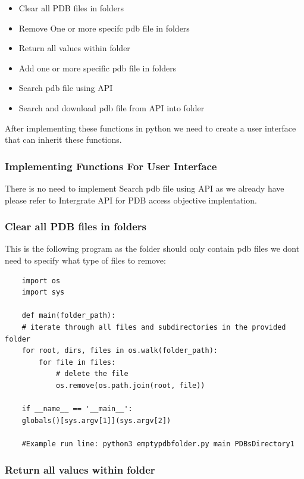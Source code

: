 \documentclass[]{final_report}
\begin{document}
\begin{itemize}
    \item Clear all PDB files in folders
    \item Remove One or more specifc pdb file in folders
    \item Return all values within folder
    \item Add one or more specific pdb file in folders
    \item Search pdb file using API
    \item Search and download pdb file from API into folder
\end{itemize}

After implementing these functions in python we need to create a user interface that can inherit these functions.

\subsubsection{Implementing Functions For User Interface}

There is no need to implement Search pdb file using API as we already have please refer to Intergrate API for PDB access objective implentation.

\subsubsection{Clear all PDB files in folders}

This is the following program as the folder should only contain pdb files we dont need to specify what type of files to remove:

\begin{lstlisting}
    import os
    import sys

    def main(folder_path):
    # iterate through all files and subdirectories in the provided folder
    for root, dirs, files in os.walk(folder_path):
        for file in files:
            # delete the file
            os.remove(os.path.join(root, file))

    if __name__ == '__main__':
    globals()[sys.argv[1]](sys.argv[2])

    #Example run line: python3 emptypdbfolder.py main PDBsDirectory1   

\end{lstlisting}

\subsubsection{Return all values within folder}
\end{document}
